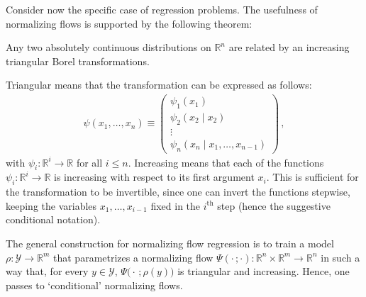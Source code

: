     Consider now the specific case of regression problems. The usefulness of normalizing flows is supported by the following theorem:
    \begin{theorem}
        Any two absolutely continuous distributions on $\mathbb{R}^n$ are related by an increasing triangular Borel transformations.
    \end{theorem}
    Triangular means that the transformation can be expressed as follows:
    \begin{gather}
        \psi(x_1,\ldots,x_n)\equiv
        \begin{pmatrix}
            \psi_1(x_1)\\
            \psi_2(x_2\mid x_2)\\
            \vdots\\
            \psi_n(x_n\mid x_1,\ldots,x_{n-1})
        \end{pmatrix}\,,
    \end{gather}
    with $\psi_i:\mathbb{R}^i\rightarrow\mathbb{R}$ for all $i\leq n$. Increasing means that each of the functions $\psi_i:\mathbb{R}^i\rightarrow\mathbb{R}$ is increasing with respect to its first argument $x_i$. This is sufficient for the transformation to be invertible, since one can invert the functions stepwise, keeping the variables $x_1,\ldots,x_{i-1}$ fixed in the $i^{\text{th}}$ step (hence the suggestive conditional notation).

    The general construction for normalizing flow regression is to train a model $\rho:\mathcal{Y}\rightarrow\mathbb{R}^m$ that parametrizes a normalizing flow $\Psi(\cdot\,;\cdot):\mathbb{R}^n\times\mathbb{R}^m\rightarrow\mathbb{R}^n$ in such a way that, for every $y\in\mathcal{Y}$, $\Psi\bigl(\cdot\,;\rho(y)\bigr)$ is triangular and increasing. Hence, one passes to `conditional' normalizing flows.